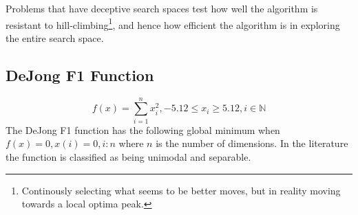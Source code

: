 Problems that have deceptive search spaces test how well the algorithm is resistant to hill-climbing\footnote{Continously selecting what seems to be better moves, but in reality  moving towards a local optima peak.}, and hence how efficient the algorithm is in exploring the entire search space\cite{evalevoalgo}.
\subsection{DeJong F1 Function}
\begin{equation}
\label{eq:DeJongF1}
	f(x) = \sum_{i=1}^n x^2_i, -5.12 \leq x_i \geq 5.12, i \in \mathbb{N}
\end{equation}
The DeJong F1 function has the following global minimum when $f(x) = 0, x(i) = 0, i:n$ where $n$ is the number of dimensions\cite{numericalABC,ABCCompareStudy,ARPSO,PerfABC,ContinACSTS,TestFunctions}. In the literature the function is classified as being unimodal and separable\cite{ABCCompareStudy,TestFunctions}. 

